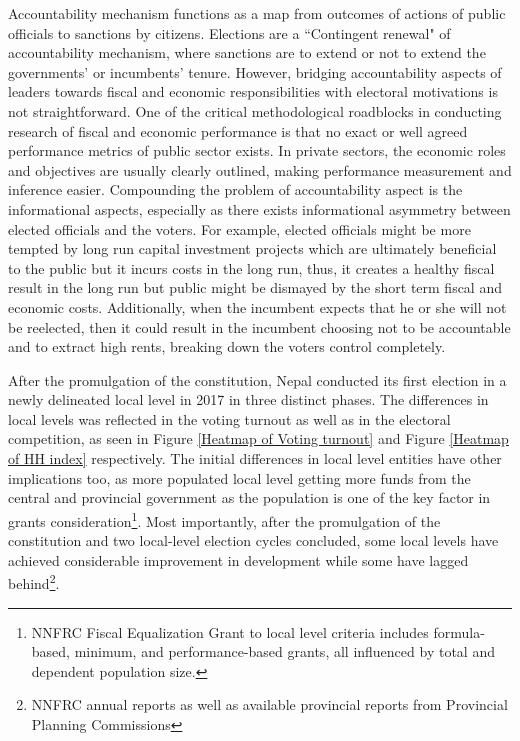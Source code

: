 Accountability mechanism functions as a map from outcomes of actions of public officials to sanctions by citizens. Elections are a ``Contingent renewal" of accountability mechanism, where sanctions are to extend or not to extend the governments' or incumbents' tenure\cite{Przeworski1999}. However, bridging accountability aspects of leaders towards fiscal and economic responsibilities with electoral motivations is not straightforward. One of the critical methodological roadblocks in conducting research of fiscal and economic performance is that no exact or well agreed performance metrics of public sector exists\cite{Estrella2003, Andrews2003, Uphoff2005}. In private sectors, the economic roles and objectives are usually clearly outlined, making performance measurement and inference easier. Compounding the problem of accountability aspect is the informational aspects, especially as there exists informational asymmetry between elected officials and the voters. For example, elected officials might be more tempted by long run capital investment projects which are ultimately beneficial to the public but it incurs costs in the long run, thus, it creates a healthy fiscal result in the long run but public might be dismayed by the short term fiscal and economic costs. Additionally, when the incumbent expects that he or she will not be reelected, then it could result in the incumbent choosing not to be accountable and to extract high rents, breaking down the voters control completely\cite{Ferejohn1986, Banks1998}.   \par
After the promulgation of the constitution, Nepal conducted its first election in a newly delineated local level in 2017 in three distinct phases. The differences in local levels was reflected in the voting turnout as well as in the electoral competition, as seen in Figure \ref{Heatmap of Voting turnout} and Figure \ref{Heatmap of HH index} respectively. The initial differences in local level entities have other implications too, as more populated local level getting more funds from the central and provincial government as the population is one of the key factor in grants consideration\footnote{NNFRC Fiscal Equalization Grant to local level criteria includes formula-based, minimum, and performance-based grants, all influenced by total and dependent population size.}. Most importantly, after the promulgation of the constitution and two local-level election cycles concluded, some local levels have achieved considerable improvement in development while some have lagged behind\footnote{NNFRC annual reports as well as available provincial reports from Provincial Planning Commissions}. 
